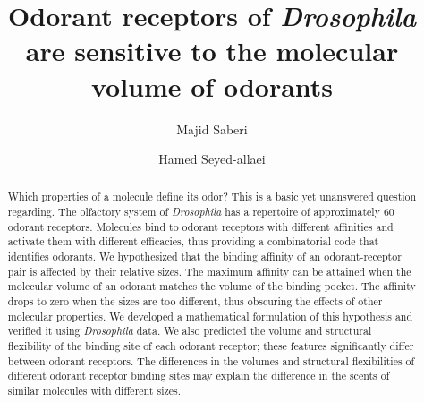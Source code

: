 \documentclass[fleqn,11pt]{wlscirep}
\title{Odorant receptors of \textit{Drosophila} are sensitive to the molecular volume of odorants}
\author[1]{Majid Saberi}
\author[1,*]{Hamed Seyed-allaei}
\affil[1]{School of Cognitive Sciences, Institute for Research in Fundamental Sciences (IPM), Tehran, Iran}
\affil[*]{hamed@ipm.ir}
\begin{document}

\begin{abstract} 
Which properties of a molecule define its odor? This is a basic yet unanswered question regarding. 
The olfactory system of \textit{Drosophila} has a repertoire of approximately 60 odorant receptors. 
Molecules bind to odorant receptors with different affinities and activate them with different efficacies, 
thus providing a combinatorial code that identifies odorants. 
We hypothesized that the binding affinity of an odorant-receptor pair is affected by their relative sizes. 
The maximum affinity can be attained when the molecular volume of an odorant matches the volume of the binding pocket. 
The affinity drops to zero when the sizes are too different, thus obscuring the effects of other molecular properties. 
We developed a mathematical formulation of this hypothesis and verified it using \textit{Drosophila} data. 
We also predicted the volume and structural flexibility of the binding site of each odorant receptor; these features significantly differ between odorant receptors. 
The differences in the volumes and structural flexibilities of different odorant receptor binding sites may explain the difference in the scents of similar molecules with different sizes. 
\end{abstract}

\flushbottom
\maketitle

\thispagestyle{empty}

\end{document}
